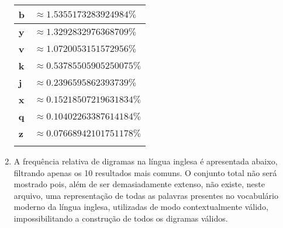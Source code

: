 \documentclass{article}
\begin{document}
\begin{enumerate}
\begin{center}
\begin{minipage}{.33\linewidth}
\begin{tabular}{>{\bfseries}ll}
            \end{tabular}
        \end{minipage}
        \begin{minipage}{.33\linewidth}
            \begin{tabular}{>{\bfseries}ll}
                \hline
                b & $\approx 1.5355173283924984\%$     \\ \hline
                y & $\approx 1.3292832976368709\%$     \\ \hline
                v & $\approx 1.0720053151572956\%$     \\ \hline
                k & $\approx 0.53785505905250075\%$    \\ \hline
                j & $\approx 0.2396595862393739\%$     \\ \hline
                x & $\approx 0.15218507219631834\%$    \\ \hline
                q & $\approx 0.10402263387614184\%$    \\ \hline
                z & $\approx 0.07668942101751178\%$    \\ \hline
                  &                                    \\ \hline
            \end{tabular}
        \end{minipage}
    \end{center}

    \item A frequência relativa de digramas na língua inglesa é apresentada
        abaixo, filtrando apenas os 10 resultados mais comuns. O conjunto
        total não será mostrado pois, além de ser demasiadamente extenso, não
        existe, neste arquivo, uma representação de todas as palavras
        presentes no vocabulário moderno da língua inglesa, utilizadas de modo
        contextualmente válido, impossibilitando a construção de todos os
        digramas válidos.


\end{enumerate}
\end{document}
